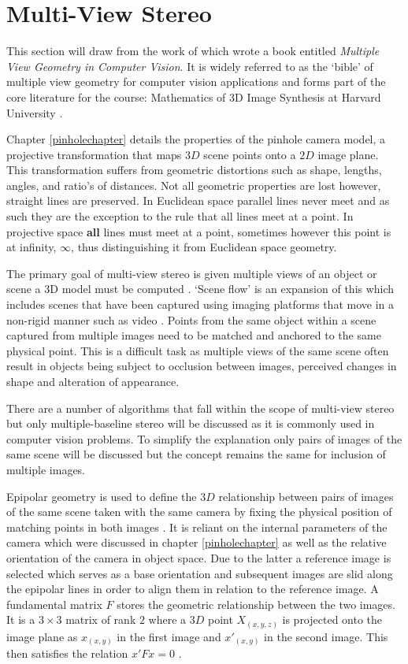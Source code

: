 \section{Multi-View Stereo \label{multi-view baseline}}
This section will draw from the work of \citet{hartley_multiple_2003} which wrote a book entitled \textit{Multiple View Geometry in Computer Vision}. It is widely referred to as the `bible' of multiple view geometry for computer vision applications and forms part of the core literature for the course: Mathematics of 3D Image Synthesis at Harvard University \citep{knill_core_2008}.

Chapter \ref{pinholechapter} details the properties of the pinhole camera model, a projective transformation that maps $3D$ scene points onto a $2D$ image plane. This transformation suffers from geometric distortions such as shape, lengths, angles, and ratio's of distances. Not all geometric properties are lost however, straight lines are preserved. In Euclidean space parallel lines never meet and as such they are the exception to the rule that all lines meet at a point. In projective space \textbf{all} lines must meet at a point, sometimes however this point is at infinity, $\infty$, thus distinguishing it from Euclidean space geometry.

The primary goal of multi-view stereo is given multiple views of an object or scene a 3D model must be computed \citep{seitz_comparison_2006}. `Scene flow' is an expansion of this which includes scenes that have been captured using imaging platforms that move in a non-rigid manner such as video \citep{vedula_three-dimensional_2005}. Points from the same object within a scene captured from multiple images need to be matched and anchored to the same physical point. This is a difficult task as multiple views of the same scene often result in objects being subject to occlusion between images, perceived changes in shape and alteration of appearance. 

There are a number of algorithms that fall within the scope of multi-view stereo but only multiple-baseline stereo will be discussed as it is commonly used in computer vision problems. To simplify the explanation only pairs of images of the same scene will be discussed but the concept remains the same for inclusion of multiple images.
 
Epipolar geometry is used to define the $3D$ relationship between pairs of images of the same scene taken with the same camera by fixing the physical position of matching points in both images \citep{klingner_university_2014}. It is reliant on the internal parameters of the camera which were discussed in chapter \ref{pinholechapter} as well as the relative orientation of the camera in object space. Due to the latter a reference image is selected which serves as a base orientation and subsequent images are slid along the epipolar lines in order to align them in relation to the reference image. A fundamental matrix $F$ stores the geometric relationship between the two images. It is a $3\times 3$ matrix of rank $2$ where a $3D$ point $X_{(x,y,z)}$ is projected onto the image plane as $x_{(x,y)}$ in the first image and $x'_{(x,y)}$ in the second image. This then satisfies the relation $x'Fx = 0$ \citep{hartley_multiple_2003}. \clearpage

